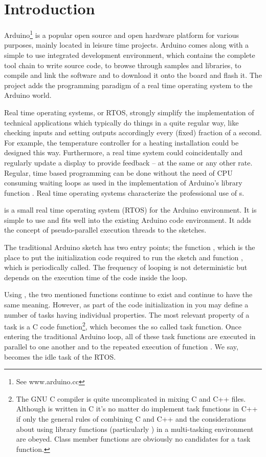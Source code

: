 \chapter{Introduction}
\label{secInrto}

Arduino\footnote{See www.arduino.cc} is a popular open source and open
hardware \uC{} platform for various purposes, mainly located in leisure
time projects. Arduino comes along with a simple to use integrated
development en\-vi\-ron\-ment, which contains the complete tool chain to
write source code, to browse through samples and libraries, to compile and
link the software and to download it onto the board and flash it. The
\rtos{} project adds the programming paradigm of a real time operating
system to the Arduino world.

Real time operating systems, or RTOS, strongly simplify the implementation
of technical applications which typically do things in a quite regular
way, like checking inputs and setting outputs accordingly every (fixed)
fraction of a second. For example, the temperature controller for a
heating installation could be designed this way. Furthermore, a real time
system could coincidentally and regularly update a display to provide
feedback -- at the same or any other rate. Regular, time based programming
can be done without the need of CPU consuming waiting loops as used in the
implementation of Arduino's library function . Real time
operating systems characterize the professional use of \uC{}s.

\rtos{} is a small real time operating system (RTOS) for the Arduino
environment. It is simple to use and fits well into the existing Arduino
code environment. It adds the concept of pseudo-parallel execution threads
to the sketches.

The traditional Arduino sketch has two entry points; the function
, which is the place to put the initialization code required
to run the sketch and function , which is periodically
called. The frequency of looping is not deterministic but depends on
the execution time of the code inside the loop.

Using \rtos{}, the two mentioned functions continue to exist and continue
to have the same meaning. However, as part of the code initialization in
 you may define a number of tasks having individual
properties. The most relevant property of a task is a C code
function\footnote{The GNU C compiler is quite uncomplicated in mixing C
and C++ files. Although \rtos{} is written in C it's no matter do
implement task functions in C++ if only the general rules of combining C
and C++ and the considerations about using library functions (particularly
) in a multi-tasking environment are obeyed. Class member
functions are obviously no candidates for a task function.}, which becomes
the so called task function. Once entering the traditional Arduino loop,
all of these task functions are executed in parallel to one another and to
the repeated execution of function . We say, 
becomes the idle task of the RTOS.

